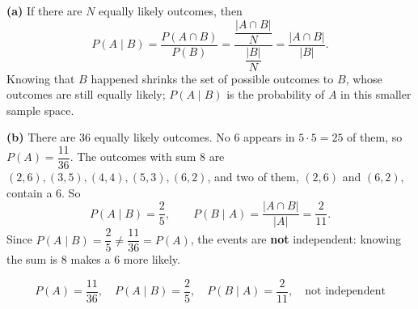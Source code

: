 \textbf{(a)} If there are $N$ equally likely outcomes, then
\[P(A\mid B)=\dfrac{P(A\cap B)}{P(B)}=\dfrac{\dfrac{|A\cap B|}{N}}{\dfrac{|B|}{N}}=\dfrac{|A\cap B|}{|B|}.\]
Knowing that $B$ happened shrinks the set of possible outcomes to $B$, whose outcomes are still equally likely; $P(A\mid B)$ is the probability of $A$ in this smaller sample space.

\textbf{(b)} There are $36$ equally likely outcomes. No $6$ appears in $5\cdot5=25$ of them, so $P(A)=\dfrac{11}{36}$. The outcomes with sum $8$ are $(2,6),(3,5),(4,4),(5,3),(6,2)$, and two of them, $(2,6)$ and $(6,2)$, contain a $6$. So
\[P(A\mid B)=\dfrac25,\qquad P(B\mid A)=\dfrac{|A\cap B|}{|A|}=\dfrac{2}{11}.\]
Since $P(A\mid B)=\dfrac25\ne\dfrac{11}{36}=P(A)$, the events are \textbf{not} independent: knowing the sum is $8$ makes a $6$ more likely.

\[\boxed{P(A)=\dfrac{11}{36},\quad P(A\mid B)=\dfrac25,\quad P(B\mid A)=\dfrac{2}{11},\quad\text{not independent}}\]
